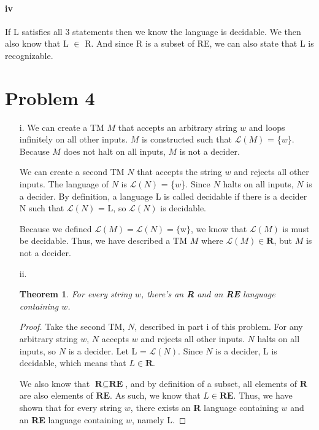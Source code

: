 \documentclass[10pt,letter]{article}
\newtheorem*{thm}{Theorem}
\begin{document}
\paragraph{iv}
If L satisfies all 3 statements then we know the language is decidable. We then also know that L $\in$ R. And since R is a subset of RE, we can also state that L is recognizable. 

\section*{Problem 4}
\begin{enumerate}
\item[i. ] We can create a TM $M$ that accepts an arbitrary string $w$ and loops infinitely on all other inputs. $M$ is constructed such that $\mathscr{L}(M)$ = \{$w$\}. Because $M$ does not halt on all inputs, $M$ is not a decider. 

We can create a second TM $N$ that accepts the string $w$ and rejects all other inputs. The language of $N$ is $\mathscr{L}(N)$ = \{$w$\}. Since $N$ halts on all inputs, $N$ is a decider. By definition, a language L is called decidable if there is a decider N such that $\mathscr{L}(N)$ = L, so $\mathscr{L}(N)$ is decidable. 

Because we defined $\mathscr{L}(M) = \mathscr{L}(N) = \{$w$\}$, we know that $\mathscr{L}(M)$ is must be decidable. Thus, we have described a TM $M$ where $\mathscr{L}(M) \in \textbf{R}$, but $M$ is not a decider.

\item[ii. ] 
\begin{thm} For every string $w$, there's an \textbf{R} and an \textbf{RE} language containing $w$.\end{thm}
\begin{proof} Take the second TM, $N$, described in part i of this problem. For any arbitrary string $w$, $N$ accepts $w$ and rejects all other inputs. $N$ halts on all inputs, so $N$ is a decider. Let L = $\mathscr{L}(N)$. Since $N$ is a decider, L is decidable, which means that $L \in \textbf{R}$. 

We also know that $\textbf{R} \subseteq \textbf{RE}$, and by definition of a subset, all elements of $\textbf{R}$ are also elements of $\textbf{RE}$. As such, we know that $L \in \textbf{RE}$. Thus, we have shown that for every string $w$, there exists an \textbf{R} language containing $w$ and an \textbf{RE} language containing $w$, namely L.
\end{proof}
\end{enumerate}
\end{document}
